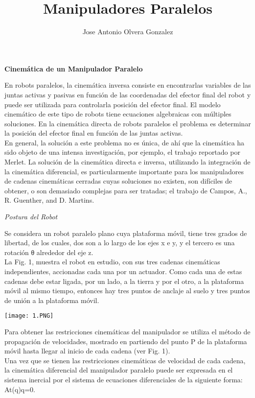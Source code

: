\documentclass[12pt,letterpaper]{report}
\author{Jose Antonio Olvera Gonzalez }
\title{Manipuladores Paralelos }
\begin{document}
\begin{center}
\textbf{Cinemática de un Manipulador Paralelo }
\begin{flushleft}
En robots paralelos, la cinemática inversa consiste en encontrarlas variables de las juntas activas y pasivas en función de
las coordenadas del efector final del robot y puede ser utilizada para controlarla posición del efector final. El modelo cinemático de este tipo de robots tiene ecuaciones algebraicas
con múltiples soluciones. En la cinemática directa de robots paralelos el problema
es determinar la posición del efector final en función de
las juntas activas. \\
En general, la solución a este problema
no es única, de ahí que la cinemática ha sido objeto de una
intensa investigación, por ejemplo, el trabajo reportado por
Merlet. La solución de la cinemática directa e inversa, utilizando la
integración de la cinemática diferencial, es particularmente
importante para los manipuladores de cadenas cinemáticas
cerradas cuyas soluciones no existen, son difíciles de obtener, o son demasiado complejas para ser tratadas; el trabajo
de Campos, A., R. Guenther, and D. Martins.
\begin{flushleft}
\emph{Postura del Robot}
\begin{flushleft}
Se considera un robot paralelo plano cuya plataforma móvil,
tiene tres grados de libertad, de los cuales, dos son a lo largo
de los ejes x e y, y el tercero es una rotación θ alrededor del
eje z.\\
La Fig. 1, muestra el robot en estudio, con sus tres cadenas
cinemáticas independientes, accionadas cada una por un actuador. Como cada una de estas cadenas debe estar ligada,
por un lado, a la tierra y por el otro, a la plataforma móvil al mismo tiempo, entonces hay tres puntos de anclaje al suelo
y tres puntos de unión a la plataforma móvil. 
\begin{center}
\texttt{[image: 1.PNG]} 
\begin{flushleft}
Para obtener las restricciones cinemáticas del manipulador
se utiliza el método de propagación de velocidades, mostrado en  partiendo del punto P de la plataforma móvil
hasta llegar al inicio de cada cadena (ver Fig. 1). \\
Una vez que se tienen las restricciones cinemáticas de velocidad de cada cadena, la cinemática diferencial del manipulador paralelo puede ser expresada en el sistema inercial por
el sistema de ecuaciones diferenciales de la siguiente forma: At(q)q=0.\begin{flushleft}

\end{flushleft}
\end{flushleft}
\end{center}
\end{flushleft}
\end{flushleft}
\end{flushleft}
\end{center}
\end{document}
